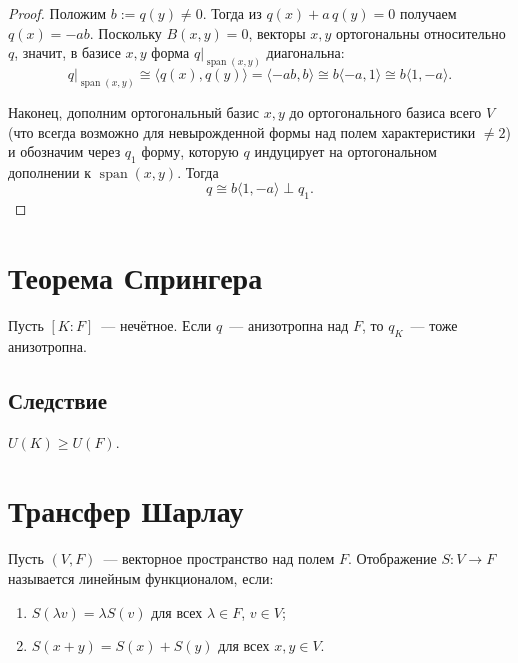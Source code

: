 \documentclass[12pt]{article}
\begin{document}
\begin{proof}
		Положим $b := q(y) \neq 0$. Тогда из $q(x) + a\,q(y) = 0$ получаем $q(x) = -ab$. Поскольку $B(x, y) = 0$, векторы $x, y$ ортогональны относительно $q$, значит, в базисе $x, y$ форма $q|_{\operatorname{span}(x,y)}$ диагональна:
		\[
		q|_{\operatorname{span}(x,y)} \cong \langle q(x), q(y) \rangle = \langle -ab, b \rangle \cong b\langle -a, 1 \rangle \cong b \langle 1, -a \rangle.
		\]
		
		Наконец, дополним ортогональный базис $x, y$ до ортогонального базиса всего $V$ (что всегда возможно для невырожденной формы над полем характеристики $\neq 2$) и обозначим через $q_1$ форму, которую $q$ индуцирует на ортогональном дополнении к $\operatorname{span}(x,y)$. Тогда
		\[
		q \cong b\langle 1, -a \rangle \perp q_1.
		\]
	\end{proof}
	
	\section{Теорема Спрингера}
	
	\begin{theorem}[Спрингера]
		Пусть $[K : F]$~--- нечётное. Если $q$~--- анизотропна над $F$, то $q_K$~--- тоже анизотропна.
	\end{theorem}
	
	\subsection{Следствие}
	
	\begin{corollary}
		$U(K) \geqslant U(F)$.
	\end{corollary}
	
	\section{Трансфер Шарлау}
	
	\begin{definition}
		Пусть $(V, F)$~--- векторное пространство над полем $F$. Отображение $S: V \rightarrow F$ называется линейным функционалом, если:
		\begin{enumerate}
			\item $S(\lambda v) = \lambda S(v)$ для всех $\lambda \in F$, $v \in V$;
			\item $S(x + y) = S(x) + S(y)$ для всех $x, y \in V$.
		\end{enumerate}
	\end{definition}
	
\end{document}
